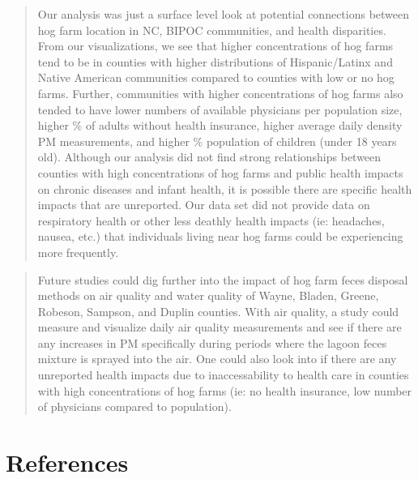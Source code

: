 \documentclass[
  12pt,
]{article}
\begin{document}
\begin{quote}
Our analysis was just a surface level look at potential connections
between hog farm location in NC, BIPOC communities, and health
disparities. From our visualizations, we see that higher concentrations
of hog farms tend to be in counties with higher distributions of
Hispanic/Latinx and Native American communities compared to counties
with low or no hog farms. Further, communities with higher
concentrations of hog farms also tended to have lower numbers of
available physicians per population size, higher \% of adults without
health insurance, higher average daily density PM measurements, and
higher \% population of children (under 18 years old). Although our
analysis did not find strong relationships between counties with high
concentrations of hog farms and public health impacts on chronic
diseases and infant health, it is possible there are specific health
impacts that are unreported. Our data set did not provide data on
respiratory health or other less deathly health impacts (ie: headaches,
nausea, etc.) that individuals living near hog farms could be
experiencing more frequently.
\end{quote}

\begin{quote}
Future studies could dig further into the impact of hog farm feces
disposal methods on air quality and water quality of Wayne, Bladen,
Greene, Robeson, Sampson, and Duplin counties. With air quality, a study
could measure and visualize daily air quality measurements and see if
there are any increases in PM specifically during periods where the
lagoon feces mixture is sprayed into the air. One could also look into
if there are any unreported health impacts due to inaccessability to
health care in counties with high concentrations of hog farms (ie: no
health insurance, low number of physicians compared to population).
\end{quote}

\newpage

\hypertarget{references}{%
\section{References}\label{references}}
\end{document}
